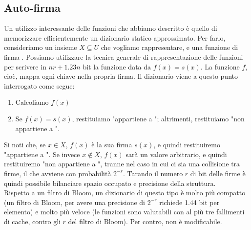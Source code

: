 \subsection{Auto-firma}
Un utilizzo interessante delle funzioni che abbiamo descritto è quello di memorizzare efficientemente un dizionario statico approssimato. Per farlo, consideriamo un insieme $X \subseteq U$ che vogliamo rappresentare, e una funzione di firma .
Possiamo utilizzare la tecnica generale di rappresentazione delle funzioni per scrivere in $nr + 1.23n$ bit la funzione  data da $f(x) = s(x)$. La funzione $f$, cioè, mappa ogni chiave nella propria firma. Il dizionario viene a questo punto interrogato come segue:
\begin{enumerate}
    \item Calcoliamo $f(x)$
    \item Se $f(x) = s(x)$, restituiamo "appartiene a "; altrimenti, restituiamo "non appartiene a ".
\end{enumerate}
Si noti che, se $x \in X$, $f(x)$ è la sua firma $s(x)$, e quindi restituiremo "appartiene a ". Se invece $x \notin X$, $f(x)$ sarà un valore arbitrario, e quindi restituiremo "non appartiene a ", tranne nel caso in cui ci sia una collisione tra firme, il che avviene con probabilità $2^{-r}$. Tarando il numero $r$ di bit delle firme è quindi possibile bilanciare spazio occupato e precisione della struttura.\\
Rispetto a un filtro di Bloom, un dizionario di questo tipo è molto più compatto (un filtro di Bloom, per avere una precisione di $2^{-r}$ richiede 1.44 bit per elemento) e molto più veloce (le funzioni sono valutabili con al più tre fallimenti di cache, contro gli $r$ del filtro di Bloom). Per contro, non è modificabile.